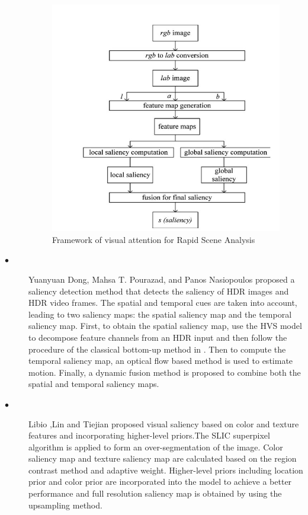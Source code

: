 \begin{description}
\begin{figure}[h!]
  \centering
  \includegraphics[width=1\textwidth,height=0.9\textwidth]{pictures/figure4.jpg}
  \caption[]{Framework of visual attention for Rapid Scene Analysis \cite{guo2010novel}}
  \label{orangeleaf}
\end{figure}

\item[$\bullet$] Yuanyuan Dong, Mahsa T. Pourazad, and Panos
Nasiopoulos\cite{dong2016human}   proposed a saliency detection method that
detects the saliency of HDR images and HDR video frames.
The spatial and temporal cues are taken into account, leading
to two saliency maps: the spatial saliency map and the
temporal saliency map. First, to obtain the spatial saliency
map, use the HVS model to decompose feature channels from
an HDR input and then follow the procedure of the classical
bottom-up method in \cite{itti1998model}. Then to compute the temporal
saliency map, an optical flow based method is used to
estimate motion. Finally, a dynamic fusion method is
proposed to combine both the spatial and temporal saliency
maps.

\item[$\bullet$]Libio ,Lin and Tiejian \cite{zhang2016unified}  proposed visual saliency based on 
color and texture features and incorporating higher-level priors.The SLIC superpixel algorithm is applied to form an over-segmentation of the image. Color saliency map and texture
saliency map are calculated based on the region contrast method and adaptive weight.
Higher-level priors including location prior and color prior are incorporated into the model to
achieve a better performance and full resolution saliency map is obtained by using the upsampling method. 


\end{description}
